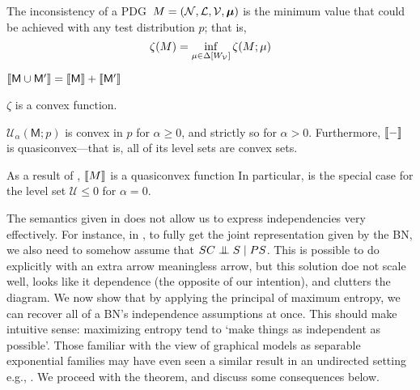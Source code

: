 \documentclass{article}
\newcommand{\bmu}{\boldsymbol{\mu}}
\newcommand{\sfM}{\mathsf M}
\newcommand{\MN}{PDG}
\numberwithin{equation}{section}
\begin{document}
\begin{notfocus}
{{	\begin{defn}\label{def:cont-inconsist}
		The inconsistency of a \MN\ $M = (\cal N, L, V, \bmu)$ is the minimum value that could be achieved with any test distribution $p$; that is, 
		\[ \zeta(M) = \inf_{ \mu \in \Delta [W_{\cal V}]} \zeta (M; \mu) 
		\]		
	\end{defn}
	\begin{prop}[name=\Cref{prop:union-set-semantics} analog]\label{prop:union-weight-semantics}
		$\bbr{\sfM \cup \sfM'} = \bbr{\sfM} + \bbr{\sfM'}$
	\end{prop}
	\begin{lemma}[name=\Cref{prop:convex} analog, restate=thmzetaconvex]\label{thm:zetaconvex}
		$\zeta$ is a convex function. %
	\end{lemma}
	\begin{coro}\label{cor:u-convex}
		$\mathcal{U}_\alpha(\sfM; p)$ is convex in $p$ for $\alpha \geq 0$, and strictly so for $\alpha> 0$. Furthermore, $\llbracket-\rrbracket$ is quasiconvex---that is, all of its level sets are convex sets.
	\end{coro}

	As a result of , $\llbracket M\rrbracket$ is a quasiconvex function 
	In particular,  is the special case for the level set $\mathcal U \leq 0$ for $\alpha = 0$. 
	
}
	

	The semantics given in  does not allow us to express independencies very effectively.
	For instance, in , to fully get the joint representation given by the BN, we also need to somehow assume that $SC \mathrel{\perp\mspace{-10mu}\perp} S \mid PS$. This is possible to do explicitly with an extra arrow meaningless arrow, but this solution doe not scale well, looks like it dependence (the opposite of our intention), and clutters the diagram. 
	We now show that by applying the principal of maximum entropy, we can recover all of a BN's independence assumptions at once. This should make intuitive sense: maximizing entropy tend to `make things as independent as possible'. 
	Those familiar with the view of graphical models as separable exponential families may have even seen a similar result in an undirected setting e.g., \parencite[cf.][pp. 37-39]{wainwright2008graphical}. 
	We proceed with the theorem, and discuss some consequences below.
	
}
\end{notfocus}
\end{document}
